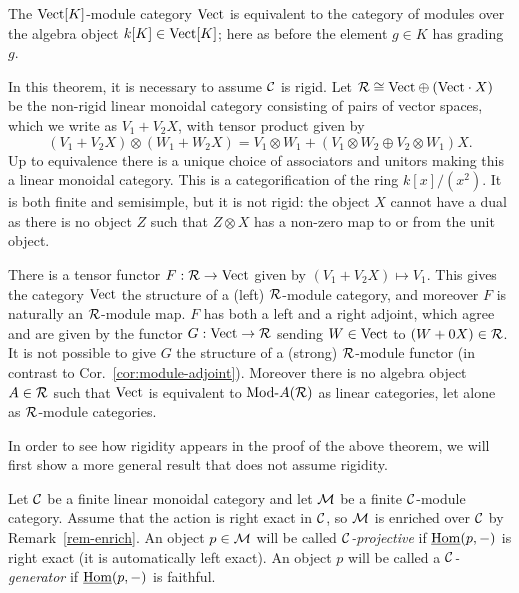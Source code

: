 \documentclass{amsart}
\begin{document}
\begin{example} \label{eg:vect}
The $\mathrm{Vect}[K]$-module category $\mathrm{Vect}$ is equivalent to the category of modules over the algebra object $k[K] \in \mathrm{Vect}[K]$; here as before the element $g \in K$ has grading $g$.  
\end{example}

\begin{example} \label{ex:lax-module}
	In this theorem, it is necessary to assume $\mathcal C$ is rigid.  Let $\mathcal R \cong \mathrm{Vect} \oplus (\mathrm{Vect} \cdot X)$ be the non-rigid linear monoidal category consisting of pairs of vector spaces, which we write as $V_1 + V_2 X$, with tensor product given by 
	\begin{equation*}
		(V_1 + V_2 X) \otimes (W_1 + W_2 X) = V_1 \otimes W_1  +  (V_1 \otimes W_2 \oplus V_2 \otimes W_1)X.
	\end{equation*} 
	Up to equivalence there is a unique choice of associators and unitors making this a linear monoidal category. 
This is a categorification of the ring $k[x]/(x^2)$.  It is both finite and semisimple, but it is not rigid: the object $X$ cannot have a dual as there is no object $Z$ such that $Z \otimes X$ has a non-zero map to or from the unit object. 
	
	There is a tensor functor $F:\mathcal R \to \mathrm{Vect}$ given by $(V_1 + V_2 X) \mapsto V_1$. This gives the category $\mathrm{Vect}$ the structure of a (left) $\mathcal R$-module category, and moreover $F$ is naturally an $\mathcal R$-module map. $F$ has both a left and a right adjoint, which agree and are given by the functor $G: \mathrm{Vect} \to \mathcal R$ sending $W \in \mathrm{Vect}$ to $(W + 0 X) \in \mathcal R$. %
	It is not possible to give $G$ the structure of a (strong) $\mathcal R$-module functor (in contrast to Cor.~\ref{cor:module-adjoint}). Moreover there is no algebra object $A \in \mathcal R$ such that $\mathrm{Vect}$ is equivalent to $\Mod{}{A}(\cR)$ as linear categories, let alone as $\mathcal R$-module categories. %
\end{example}

In order to see how rigidity appears in the proof of the above theorem, we will first show a more general result that does not assume rigidity.

\begin{definition}
	Let $\mathcal C$ be a finite linear monoidal category and let $\mathcal M$ be a finite $\mathcal C$-module category. Assume that the action is right exact in $\mathcal C$, so $\mathcal M$ is enriched over $\mathcal C$ by Remark~\ref{rem-enrich}. 
	An object $p \in \mathcal M$ will be called {\em $\mathcal C$-projective} if $\operatorname{\underline{Hom}}(p, -)$ is right exact (it is automatically left exact). An object $p$ will be called a {\em $\mathcal C$-generator} if $\operatorname{\underline{Hom}}(p,-)$ is faithful.
\end{definition}
\end{document}
